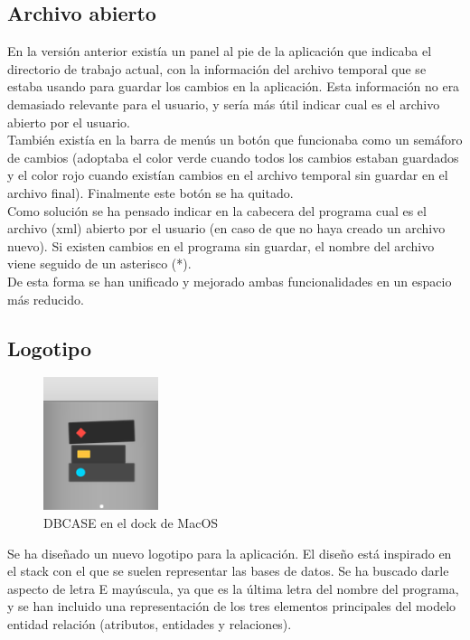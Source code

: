 \subsection{Archivo abierto}
En la versión anterior existía un panel al pie de la aplicación que indicaba el directorio de trabajo actual, con la información del archivo temporal que se estaba usando para guardar los cambios en la aplicación. Esta información no era demasiado relevante para el usuario, y sería más útil indicar cual es el archivo abierto por el usuario.\\

También existía en la barra de menús un botón que funcionaba como un semáforo de cambios (adoptaba el color verde cuando todos los cambios estaban guardados y el color rojo cuando existían cambios en el archivo temporal sin guardar en el archivo final). Finalmente este botón se ha quitado.\\

Como solución se ha pensado indicar en la cabecera del programa cual es el archivo (xml) abierto por el usuario (en caso de que no haya creado un archivo nuevo). Si existen cambios en el programa sin guardar, el nombre del archivo viene seguido de un asterisco (*).\\

De esta forma se han unificado y mejorado ambas funcionalidades en un espacio más reducido.

\subsection{Logotipo}
\begin{figure}[H]
    \centering
    \includegraphics[width=0.3\textwidth]{img/logoMac.png}
    \caption{DBCASE en el dock de MacOS}
\end{figure}
Se ha diseñado un nuevo logotipo para la aplicación. El diseño está inspirado en el stack con el que se suelen representar las bases de datos. Se ha buscado darle aspecto de letra E mayúscula, ya que es la última letra del nombre del programa, y se han incluido una representación de los tres elementos principales del modelo entidad relación (atributos, entidades y relaciones).\\

